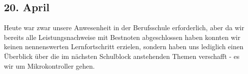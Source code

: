 \subsection{20. April}
Heute war zwar unsere Anwesenheit in der Berufsschule erforderlich, aber da wir bereits alle Leistungsnachweise mit Bestnoten abgeschlossen haben konnten wir keinen nennenswerten Lernfortschritt erzielen, sondern haben uns lediglich einen Überblick über die im nächsten Schulblock anstehenden Themen verschafft - es wir um Mikrokontroller gehen.